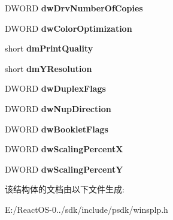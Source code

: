 \begin{DoxyCompactItemize}
D\+W\+O\+RD {\bfseries dw\+Drv\+Number\+Of\+Copies}
\item 
\mbox{\label{struct___a_t_t_r_i_b_u_t_e___i_n_f_o__4_abb5f798f0da237e3e9848610d229e57b}} 
D\+W\+O\+RD {\bfseries dw\+Color\+Optimization}
\item 
\mbox{\label{struct___a_t_t_r_i_b_u_t_e___i_n_f_o__4_a6f92e25da7bafd25a62764671473cbd0}} 
short {\bfseries dm\+Print\+Quality}
\item 
\mbox{\label{struct___a_t_t_r_i_b_u_t_e___i_n_f_o__4_ae3060df3dc7ff3b4fd909d2ffc2c1ddc}} 
short {\bfseries dm\+Y\+Resolution}
\item 
\mbox{\label{struct___a_t_t_r_i_b_u_t_e___i_n_f_o__4_a54ca4cb91a670223a920e5868a23371e}} 
D\+W\+O\+RD {\bfseries dw\+Duplex\+Flags}
\item 
\mbox{\label{struct___a_t_t_r_i_b_u_t_e___i_n_f_o__4_a3a8ae297698ee75c4f948d967a8607e8}} 
D\+W\+O\+RD {\bfseries dw\+Nup\+Direction}
\item 
\mbox{\label{struct___a_t_t_r_i_b_u_t_e___i_n_f_o__4_a7242a17cf026f233fb5b70cec3d033f1}} 
D\+W\+O\+RD {\bfseries dw\+Booklet\+Flags}
\item 
\mbox{\label{struct___a_t_t_r_i_b_u_t_e___i_n_f_o__4_ae1335b00b1ec56290b3582e72dfd70e9}} 
D\+W\+O\+RD {\bfseries dw\+Scaling\+PercentX}
\item 
\mbox{\label{struct___a_t_t_r_i_b_u_t_e___i_n_f_o__4_ae8e95c16584dbed551c5e3a397d99a36}} 
D\+W\+O\+RD {\bfseries dw\+Scaling\+PercentY}
\end{DoxyCompactItemize}


该结构体的文档由以下文件生成\+:\begin{DoxyCompactItemize}
\item 
E\+:/\+React\+O\+S-\/0../sdk/include/psdk/winsplp.\+h\end{DoxyCompactItemize}
